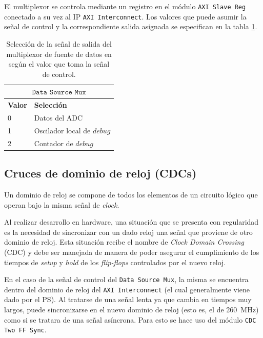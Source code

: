 \documentclass[../../main.tex]{subfiles}
\begin{document}
El multiplexor se controla mediante un registro en el módulo \texttt{AXI Slave Reg} conectado a su vez al IP \texttt{AXI Interconnect}. Los valores que puede asumir la señal de control y la correspondiente salida asignada se especifican en la tabla \ref{tab::data-source-mux}.

\begin{table}[H]
\centering
\begin{tabular}{|ll|}
\hline
\multicolumn{2}{|c|}{$\texttt{Data Source Mux}$} \\ \hline
\multicolumn{1}{|l|}{\textbf{Valor}} & \textbf{Selección} \\ \hline
\multicolumn{1}{|l|}{0} & Datos del ADC \\ \hline
\multicolumn{1}{|l|}{1} & Oscilador local de $\textit{debug}$ \\ \hline
\multicolumn{1}{|l|}{2} & Contador de $\textit{debug}$ \\ \hline
\end{tabular}
\caption{Selección de la señal de salida del multiplexor de fuente de datos en según el valor que toma la señal de control.}\label{tab::data-source-mux}
\end{table}

\subsection{Cruces de dominio de reloj (CDCs)}\label{subsec::cdcs-standalone}
Un dominio de reloj se compone de todos los elementos de un circuito lógico que operan bajo la misma señal de \textit{clock}.

Al realizar desarrollo en hardware, una situación que se presenta con regularidad es la necesidad de sincronizar con un dado reloj una señal que proviene de otro dominio de reloj. Esta situación recibe el nombre de \textit{Clock Domain Crossing} (CDC) y debe ser manejada de manera de poder asegurar el cumplimiento de los tiempos de \textit{setup} y \textit{hold} de los \textit{flip-flops} controlados por el nuevo reloj.

En el caso de la señal de control del \texttt{Data Source Mux}, la misma se encuentra dentro del dominio de reloj del \texttt{AXI Interconnect} (el cual generalmente viene dado por el PS). Al tratarse de una señal lenta ya que cambia en tiempos muy largos, puede sincronizarse en el nuevo dominio de reloj (esto es, el de 260~MHz) como si se tratara de una señal asíncrona. Para esto se hace uso del módulo \texttt{CDC Two FF Sync}.
\end{document}
